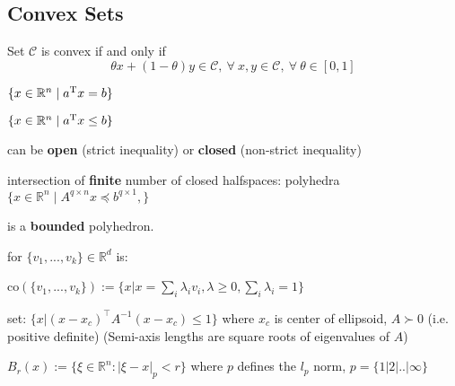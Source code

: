 \subsection{Convex Sets}

\begin{definition}
	Set $\mathcal{C}$ is convex if and only if
	\[\theta x + (1-\theta)y \in \mathcal{C},
		\ \forall\ x,y \in \mathcal{C},
		\ \forall\ \theta \in [0,1]\]
\end{definition}

\begin{definition}[Hyperplanes]
	$\{x \in \mathbb{R}^n \mid a^\textnormal{\scriptsize T} x=b\}$
\end{definition}
\begin{definition}[Halfspaces]
	$\{x \in \mathbb{R}^n \mid a^\textnormal{\scriptsize T} x\le b\}$

	can be \textbf{open} (strict inequality)
	or \textbf{closed} (non-strict inequality)
\end{definition}

\begin{definition}[Polyhedra] intersection of
	\textbf{finite} number of closed halfspaces:
	polyhedra $\{x\in\mathbb{R}^n\mid A^{q\times n}x\preceq b^{q\times1},
		\}$
\end{definition}

\begin{definition}[Polytope]
	is a \textbf{bounded} polyhedron.
\end{definition}

\begin{definition}
	for  $\{v_1,...,v_k\}\in \mathbb{R}^{d}$ is:

	co$(\{v_1,...,v_k\}):=
		\{ x|x=\sum_{i}\lambda_iv_i,
		\lambda\ge0, \sum_{i}\lambda_i=1 \}$
\end{definition}

\begin{definition}[Ellipsoid]
	set:
	$\{ x | (x\!-\!x_c)^\top A^{-1}(x\!-\!x_c) \leq 1 \}$
	where $x_c$ is center of ellipsoid,
	$A \succ 0$ (i.e. positive definite)
	(Semi-axis lengths are square roots of eigenvalues of $A$)
\end{definition}

\begin{definition}
	$B_r(x):=
		\{\xi\in\mathbb{R}^{n}:|\xi-x|_p<r\}$
	where $p$ defines the $l_p$ norm, $p=\{1|2|..|\infty\}$
\end{definition}



